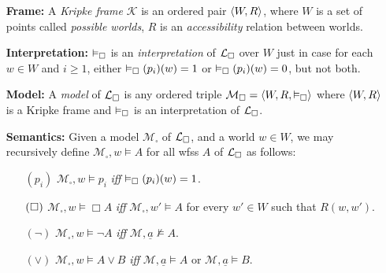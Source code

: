 \documentclass[a4paper, 11pt]{article} %
\begin{document}
\begin{enumerate}[leftmargin=1.2in,labelsep=.15in] %
\item[\bf Frame:] A \textit{Kripke frame} $\mathcal{K}$ is an ordered pair $\langle W,R\rangle$, where $W$ is a set of points called \textit{possible worlds}, $R$ is an \textit{accessibility} relation between worlds.
\item[\bf Interpretation:] $\vDash_{\square}$ is an \textit{interpretation} of $\mathcal{L}_\square$ over $W$ just in case for each $w\in W$ and $i\geq1$, either $\vDash_{\square}(p_i)(w)=1$ or $\vDash_{\square}(p_i)(w)=0$, but not both.
\item[\bf Model:] A \textit{model} of $\mathcal{L}_\square$ is any ordered triple $\mathcal{M}_\square=\langle W,R,\vDash_{\square}\rangle$ where $\langle W,R\rangle$ is a Kripke frame and $\vDash_{\square}$ is an interpretation of $\mathcal{L}_\square$.
\item[\bf Semantics:] Given a model $\mathcal{M}_\square$ of $\mathcal{L}_\square$, and a world $w\in W$, we may recursively define $\mathcal{M}_\square,w\vDash A$ for all wfss $A$ of $\mathcal{L}_\square$ as follows:
\begin{small}
\begin{itemize}[leftmargin=.36in]
\item[$(p_i)$] $\mathcal{M}_\square,w\vDash  p_i$ \textit{iff} $\vDash_{\square}(p_i)(w)=1$.
\item[$(\hspace{.3pt}\Box\hspace{.3pt})$] $\mathcal{M}_\square,w\vDash  \Box A$ \textit{iff} $\mathcal{M}_\square,w'\vDash A$ for every $w'\in W$ such that $R(w,w')$.
\item[$(\neg)$] $\mathcal{M}_\square,w\vDash  \neg A$ \textit{iff} $\mathcal{M},\underline{a}\nvDash A$.
\item[$(\vee)$] $\mathcal{M}_\square,w\vDash  A\vee B$ \textit{iff} $\mathcal{M},\underline{a}\vDash  A$ or $\mathcal{M},\underline{a}\vDash  B$.

\end{itemize}
\end{small}
\end{enumerate}
\end{document}
